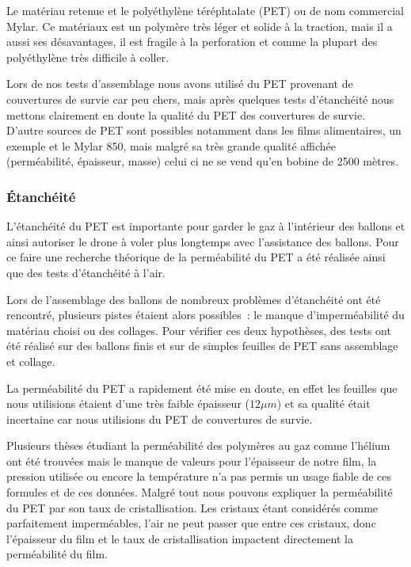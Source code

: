 \documentclass[a4paper,11pt]{article}
\begin{document}
Le matériau retenue et le polyéthylène téréphtalate (PET) ou de nom commercial Mylar. Ce matériaux est un polymère très léger et solide à la traction, mais il a aussi ses désavantages, il est fragile à la perforation et comme la plupart des polyéthylène très difficile à coller.

Lors de nos tests d'assemblage nous avons utilisé du PET provenant de couvertures de survie car peu chers, mais après quelques tests d'étanchéité nous mettons clairement en doute la qualité du PET des couvertures de survie. D'autre sources de PET sont possibles notamment dans les films alimentaires, un exemple et le Mylar 850, mais malgré sa très grande qualité affichée (perméabilité, épaisseur, masse) celui ci ne se vend qu'en bobine de 2500 mètres.

\subsubsection{Étanchéité}

L'étanchéité du PET est importante pour garder le gaz à l'intérieur des ballons et ainsi autoriser le drone à voler plus longtemps avec l'assistance des ballons. Pour ce faire une recherche théorique de la perméabilité du PET a été réalisée ainsi que des tests d'étanchéité à l'air.

Lors de l'assemblage des ballons de nombreux problèmes d'étanchéité ont été rencontré, plusieurs pistes étaient alors possibles~: le manque d'imperméabilité du matériau choisi ou des collages. Pour vérifier ces deux hypothèses, des tests ont été réalisé sur des ballons finis et sur de simples feuilles de PET sans assemblage et collage.


La perméabilité du PET a rapidement été mise en doute, en effet les feuilles que nous utilisions étaient d'une très faible épaisseur ($12\mu m$) et sa qualité était incertaine car nous utilisions du PET de couvertures de survie.

Plusieurs thèses étudiant la perméabilité des polymères au gaz comme l'hélium ont été trouvées mais le manque de valeurs pour l'épaisseur de notre film, la pression utilisée ou encore la température n'a pas permis un usage fiable de ces formules et de ces données.
Malgré tout nous pouvons expliquer la perméabilité du PET par son taux de cristallisation. Les cristaux étant considérés comme parfaitement imperméables, l'air ne peut passer que entre ces cristaux, donc l'épaisseur du film et le taux de cristallisation impactent directement la perméabilité du film.
\end{document}
